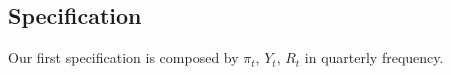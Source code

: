 \subsection{Specification}
    Our first specification is composed by \(\pi_t\), \(Y_t\), \(R_t\) in quarterly frequency.